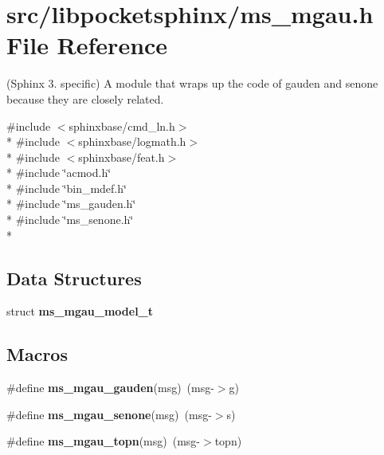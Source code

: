 \section{src/libpocketsphinx/ms\-\_\-mgau.h File Reference}
\label{ms__mgau_8h}


(Sphinx 3. specific) A module that wraps up the code of gauden and senone because they are closely related.  


{\ttfamily \#include $<$sphinxbase/cmd\-\_\-ln.\-h$>$}\\*
{\ttfamily \#include $<$sphinxbase/logmath.\-h$>$}\\*
{\ttfamily \#include $<$sphinxbase/feat.\-h$>$}\\*
{\ttfamily \#include \char`\"{}acmod.\-h\char`\"{}}\\*
{\ttfamily \#include \char`\"{}bin\-\_\-mdef.\-h\char`\"{}}\\*
{\ttfamily \#include \char`\"{}ms\-\_\-gauden.\-h\char`\"{}}\\*
{\ttfamily \#include \char`\"{}ms\-\_\-senone.\-h\char`\"{}}\\*
\subsection*{Data Structures}
\begin{DoxyCompactItemize}
\item 
struct {\bf ms\-\_\-mgau\-\_\-model\-\_\-t}
\end{DoxyCompactItemize}
\subsection*{Macros}
\begin{DoxyCompactItemize}
\item 
\#define {\bfseries ms\-\_\-mgau\-\_\-gauden}(msg)~(msg-\/$>$g)\label{ms__mgau_8h_a95f75d32387d89eb6fa2bc65e032d34c}

\item 
\#define {\bfseries ms\-\_\-mgau\-\_\-senone}(msg)~(msg-\/$>$s)\label{ms__mgau_8h_a182da1c0e7872e853566f7728001d00c}

\item 
\#define {\bfseries ms\-\_\-mgau\-\_\-topn}(msg)~(msg-\/$>$topn)\label{ms__mgau_8h_acad38d81d6485f2aad5176f8f4283579}

\end{DoxyCompactItemize}

